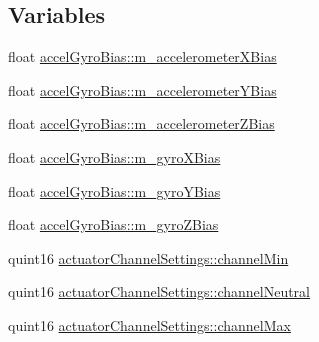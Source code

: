 \subsection*{\-Variables}
\begin{DoxyCompactItemize}
\item 
float \hyperlink{group___vehicle_configuration_source_ga982c33b20f567fe289dd461ce9bb0df2}{accel\-Gyro\-Bias\-::m\-\_\-accelerometer\-X\-Bias}
\item 
float \hyperlink{group___vehicle_configuration_source_ga76b3af5f8c4f87a92045a698eb32c681}{accel\-Gyro\-Bias\-::m\-\_\-accelerometer\-Y\-Bias}
\item 
float \hyperlink{group___vehicle_configuration_source_gaa0475cba1c09df9c39a69bbb62711b8e}{accel\-Gyro\-Bias\-::m\-\_\-accelerometer\-Z\-Bias}
\item 
float \hyperlink{group___vehicle_configuration_source_ga483a0631083ce446a08b73ecc712ed73}{accel\-Gyro\-Bias\-::m\-\_\-gyro\-X\-Bias}
\item 
float \hyperlink{group___vehicle_configuration_source_gade8f76b5b608f6446cb182c372598e53}{accel\-Gyro\-Bias\-::m\-\_\-gyro\-Y\-Bias}
\item 
float \hyperlink{group___vehicle_configuration_source_ga637101f3cecb351e7fe8d6106dd50d15}{accel\-Gyro\-Bias\-::m\-\_\-gyro\-Z\-Bias}
\item 
quint16 \hyperlink{group___vehicle_configuration_source_ga51bfc85e00becd45e4e622da70ff9d27}{actuator\-Channel\-Settings\-::channel\-Min}
\item 
quint16 \hyperlink{group___vehicle_configuration_source_gac557d0adca6e1ec8f789659c32cfbeff}{actuator\-Channel\-Settings\-::channel\-Neutral}
\item 
quint16 \hyperlink{group___vehicle_configuration_source_ga204a4e4648453d51e42ad2b82cb68fa8}{actuator\-Channel\-Settings\-::channel\-Max}
\end{DoxyCompactItemize}


